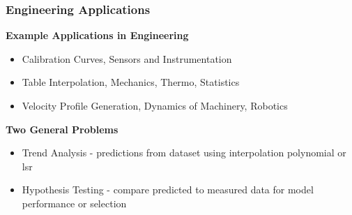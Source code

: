 \documentclass[fleqn]{beamer} %
\newcommand{\sectionIsubsectionIItitle}{Engineering Applications}
\newcommand{\sectionIsubsectionIIItitle}{}
\newcommand{\sectionIsubsectionIVtitle}{}
\begin{document}
			\begin{frame}
				\frametitle{\sectionIsubsectionIItitle} \small
				\bigskip
        \textbf{Example Applications in Engineering}
        \begin{itemize}
          
          \item Calibration Curves, Sensors and Instrumentation
          \item Table Interpolation, Mechanics, Thermo, Statistics
          \item Velocity Profile Generation, Dynamics of Machinery, Robotics
        
        \end{itemize}

        \textbf{Two General Problems}        
        \begin{itemize}
          \item Trend Analysis - predictions from dataset using interpolation polynomial or lsr
          \item Hypothesis Testing - compare predicted to measured data for model performance or selection
        \end{itemize}
				
				\btVFill
			\end{frame}


		\subsection{\sectionIsubsectionIIItitle}\label{sectionIsubsectionIII}
			\begin{frame} 
				\frametitle{\sectionIsubsectionIIItitle}
				\bigskip

				
				\btVFill
			\end{frame}	

			\begin{frame} 
				\frametitle{\sectionIsubsectionIIItitle}
				\bigskip

			 
				\btVFill
			\end{frame}	


		\subsection{\sectionIsubsectionIVtitle}\label{sectionIsubsectionIV}	

			\begin{frame}
				\frametitle{\sectionIsubsectionIVtitle}
				\bigskip


				\btVFill
			\end{frame}
	
\end{document}
